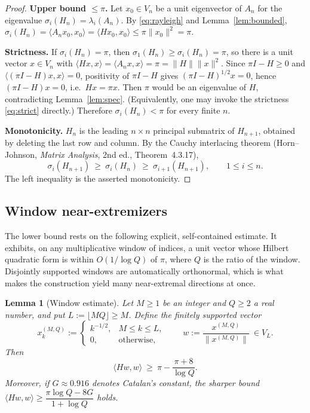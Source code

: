 \documentclass[12pt]{article}
\newtheorem{lemma}{Lemma}
\theoremstyle{remark}
\begin{document}
\begin{proof}
\textbf{Upper bound $\le\pi$.} Let $x_0\in V_n$ be a unit eigenvector of $A_n$ for the eigenvalue
$\sigma_i(H_n)=\lambda_i(A_n)$. By \eqref{eq:rayleigh} and Lemma~\ref{lem:bounded},
$\sigma_i(H_n)=\langle A_nx_0,x_0\rangle=\langle Hx_0,x_0\rangle\le\pi\|x_0\|^2=\pi$.

\textbf{Strictness.} If $\sigma_i(H_n)=\pi$, then $\sigma_1(H_n)\ge\sigma_i(H_n)=\pi$, so there is
a unit vector $x\in V_n$ with $\langle Hx,x\rangle=\langle A_nx,x\rangle=\pi=\|H\|\|x\|^2$. Since
$\pi I-H\ge0$ and $\langle(\pi I-H)x,x\rangle=0$, positivity of $\pi I-H$ gives
$(\pi I-H)^{1/2}x=0$, hence $(\pi I-H)x=0$, i.e.\ $Hx=\pi x$. Then $\pi$ would be an eigenvalue of
$H$, contradicting Lemma~\ref{lem:spec}. (Equivalently, one may invoke the strictness
\eqref{eq:strict} directly.) Therefore $\sigma_i(H_n)<\pi$ for every finite $n$.

\textbf{Monotonicity.} $H_n$ is the leading $n\times n$ principal submatrix of $H_{n+1}$,
obtained by deleting the last row and column. By the Cauchy interlacing theorem
(Horn--Johnson, \emph{Matrix Analysis}, 2nd ed., Theorem~4.3.17),
\[
\sigma_{i}(H_{n+1})\ \ge\ \sigma_{i}(H_{n})\ \ge\ \sigma_{i+1}(H_{n+1}),\qquad 1\le i\le n .
\]
The left inequality is the asserted monotonicity.
\end{proof}

\subsection{Window near-extremizers}

The lower bound rests on the following explicit, self-contained estimate. It exhibits, on any
multiplicative window of indices, a unit vector whose Hilbert quadratic form is within
$O(1/\log Q)$ of $\pi$, where $Q$ is the ratio of the window. Disjointly supported windows are
automatically orthonormal, which is what makes the construction yield many near-extremal
directions at once.

\begin{lemma}[Window estimate]\label{lem:window}
Let $M\ge1$ be an integer and $Q\ge2$ a real number, and put $L:=\lfloor MQ\rfloor\ge M$. Define
the finitely supported vector
\[
x^{(M,Q)}_k:=\begin{cases}k^{-1/2}, & M\le k\le L,\\[1mm] 0,&\text{otherwise,}\end{cases}
\qquad
w:=\frac{x^{(M,Q)}}{\bigl\|x^{(M,Q)}\bigr\|}\ \in V_L .
\]
Then
\begin{equation}\label{eq:windowbound}
\langle Hw,w\rangle\ \ge\ \pi-\frac{\pi+8}{\log Q}.
\end{equation}
Moreover, if $G\approx0.916$ denotes Catalan's constant, the sharper bound
$\langle Hw,w\rangle\ge\dfrac{\pi\log Q-8G}{1+\log Q}$ holds.
\end{lemma}
\end{document}
